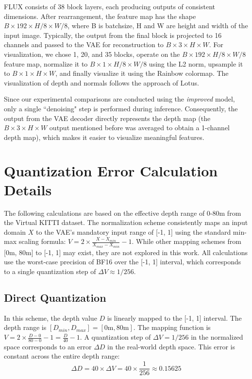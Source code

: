 \documentclass{article} %
\begin{document}
FLUX consists of 38 block layers, each producing outputs of consistent dimensions. After rearrangement, the feature map has the shape $B \times 192 \times H/8 \times W/8$, where B is batchsize, H and W are height and width of the input image. Typically, the output from the final block is projected to 16 channels and passed to the VAE for reconstruction to $B \times 3 \times H \times W$. For visualization, we chose 1, 20, and 35 blocks, operate on the $B \times 192 \times H/8 \times W/8$ feature map, normalize it to $B \times 1 \times H/8 \times W/8$ using the L2 norm, upsample it to $B \times 1 \times H \times W$, and finally visualize it using the Rainbow colormap. The visualization of depth and normals follows the approach of Lotus.

Since our experimental comparisons are conducted using the \textit{improved} model, only a single ``denoising" step is performed during inference. Consequently, the output from the VAE decoder directly represents the depth map (the $B \times 3 \times H \times W$ output mentioned before was averaged to obtain a 1-channel depth map), which makes it easier to visualize meaningful features.

\section{Quantization Error Calculation Details}
\label{supp:quant}

The following calculations are based on the effective depth range of 0-80m from the Virtual KITTI dataset. The normalization scheme consistently maps an input domain $X$ to the VAE's mandatory input range of [-1, 1] using the standard min-max scaling formula: $V = 2 \times \frac{X - X_{min}}{X_{max} - X_{min}} - 1$. While other mapping schemes from [0m, 80m] to [-1, 1] may exist, they are not explored in this work. All calculations use the worst-case precision of BF16 over the [-1, 1] interval, which corresponds to a single quantization step of $\Delta V \approx 1/256$.

\subsection{Direct Quantization}
In this scheme, the depth value $D$ is linearly mapped to the [-1, 1] interval. The depth range is $[D_{min}, D_{max}] = [0\text{m}, 80\text{m}]$.
The mapping function is $V = 2 \times \frac{D - 0}{80 - 0} - 1 = \frac{D}{40} - 1$.
A quantization step of $\Delta V = 1/256$ in the normalized space corresponds to an error $\Delta D$ in the real-world depth space. This error is constant across the entire depth range:
$$\Delta D = 40 \times \Delta V = 40 \times \frac{1}{256} \approx 0.15625$$
\end{document}
